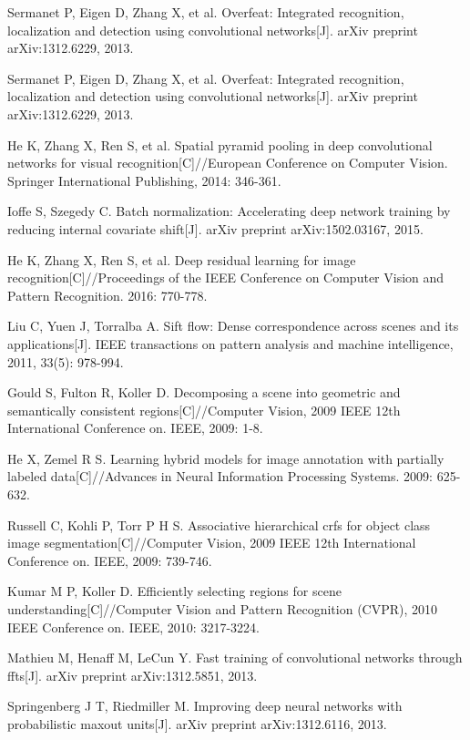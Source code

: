\documentclass[10.5pt,compsoc]{TsT}
\theoremstyle{mystyle}
\begin{document}
{\begin{thebibliography}{99}
Sermanet P, Eigen D, Zhang X, et al. Overfeat: Integrated recognition, localization and detection using convolutional networks[J]. arXiv preprint arXiv:1312.6229, 2013.

Sermanet P, Eigen D, Zhang X, et al. Overfeat: Integrated recognition, localization and detection using convolutional networks[J]. arXiv preprint arXiv:1312.6229, 2013.

He K, Zhang X, Ren S, et al. Spatial pyramid pooling in deep convolutional networks for visual recognition[C]//European Conference on Computer Vision. Springer International Publishing, 2014: 346-361.

Ioffe S, Szegedy C. Batch normalization: Accelerating deep network training by reducing internal covariate shift[J]. arXiv preprint arXiv:1502.03167, 2015.

He K, Zhang X, Ren S, et al. Deep residual learning for image recognition[C]//Proceedings of the IEEE Conference on Computer Vision and Pattern Recognition. 2016: 770-778.

Liu C, Yuen J, Torralba A. Sift flow: Dense correspondence across scenes and its applications[J]. IEEE transactions on pattern analysis and machine intelligence, 2011, 33(5): 978-994.

Gould S, Fulton R, Koller D. Decomposing a scene into geometric and semantically consistent regions[C]//Computer Vision, 2009 IEEE 12th International Conference on. IEEE, 2009: 1-8.

He X, Zemel R S. Learning hybrid models for image annotation with partially labeled data[C]//Advances in Neural Information Processing Systems. 2009: 625-632.

Russell C, Kohli P, Torr P H S. Associative hierarchical crfs for object class image segmentation[C]//Computer Vision, 2009 IEEE 12th International Conference on. IEEE, 2009: 739-746.

Kumar M P, Koller D. Efficiently selecting regions for scene understanding[C]//Computer Vision and Pattern Recognition (CVPR), 2010 IEEE Conference on. IEEE, 2010: 3217-3224.

Mathieu M, Henaff M, LeCun Y. Fast training of convolutional networks through ffts[J]. arXiv preprint arXiv:1312.5851, 2013.

Springenberg J T, Riedmiller M. Improving deep neural networks with probabilistic maxout units[J]. arXiv preprint arXiv:1312.6116, 2013.


\end{thebibliography}}
\end{document}
